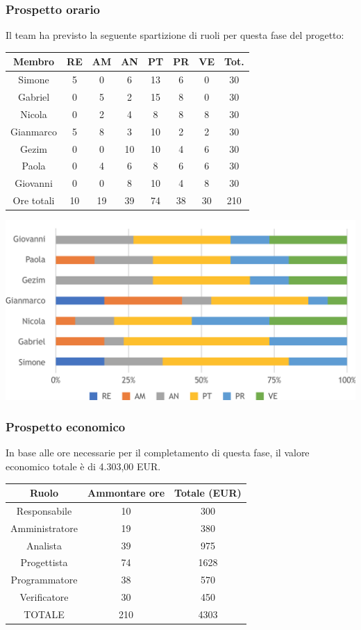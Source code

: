 \subsubsection{Prospetto orario}
Il team ha previsto la seguente spartizione di ruoli per questa fase del progetto:
\\
\begin{center}
\begin{tabular}{ |c|c|c|c|c|c|c|c|  }
 \hline
 Membro 		& RE 	& AM 	& AN 	& PT 	& PR 	& VE 	& Tot.\\
 \hline\hline
 Simone			& 5 		& 0		& 6 	& 13 	& 6 		& 0 		& 30\\
 Gabriel		& 0 		& 5 		& 2 	& 15		& 8 		& 0 		& 30\\
 Nicola			& 0 		& 2 		& 4 	& 8		& 8 		& 8 		& 30\\
 Gianmarco		& 5 		& 8 		& 3 	& 10 	& 2 		& 2 		& 30\\
 Gezim			& 0 		& 0 		& 10 	& 10		& 4 		& 6	 	& 30\\
 Paola			& 0 		& 4 		& 6 	& 8 		& 6 		& 6 		& 30\\
 Giovanni		& 0 		& 0	 	& 8 	& 10		& 4 		& 8  	& 30\\
 \hline\hline
 Ore totali		& 10		& 19		& 39 	& 74	 	& 38 	& 30 	& 210\\
  \hline
\end{tabular}
\end{center}
\includegraphics[width=\textwidth]{res/img/hi336}
\subsubsection{Prospetto economico}
In base alle ore necessarie per il completamento di questa fase, il valore economico totale è di 4.303,00 EUR.
\begin{center}
\begin{tabular}{ |c|c|c|  }
 \hline
 Ruolo 		& Ammontare ore 	& Totale (EUR)\\
 	\hline
 \hline
 	Responsabile	& 10 	& 300\\
	Amministratore	& 19		& 380\\
	Analista		& 39 	& 975\\
	Progettista		& 74		& 1628\\
	Programmatore	& 38		& 570\\
	Verificatore	& 30 	& 450\\
 \hline\hline
 TOTALE		& 210		& 4303\\
  \hline
\end{tabular}
\end{center}


